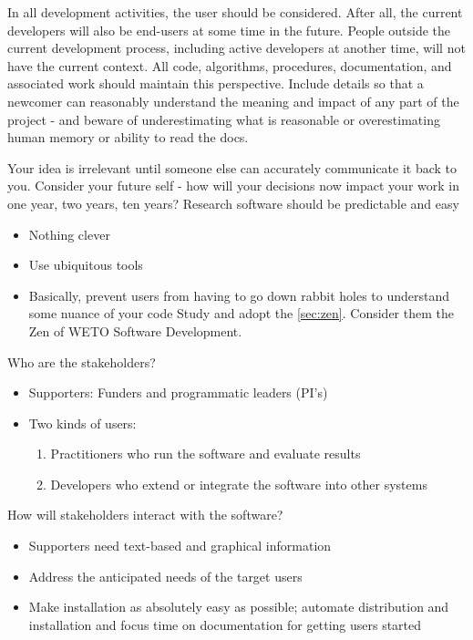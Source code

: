 \documentclass[]{nrel}
\begin{document}
In all development activities, the user should be considered.
After all, the current developers will also be end-users at some time in the future.
People outside the current development process, including active developers at another time,
will not have the current context.
All code, algorithms, procedures, documentation, and associated work should maintain this
perspective.
Include details so that a newcomer can reasonably understand the meaning and impact of any
part of the project - and beware of underestimating what is reasonable or overestimating
human memory or ability to read the docs.


Your idea is irrelevant until someone else can accurately communicate it back to you.
Consider your future self - how will your decisions now impact your work in one year, two years, ten years?
Research software should be predictable and easy
\begin{itemize}
\item Nothing clever

\item Use ubiquitous tools

\item Basically, prevent users from having to go down rabbit holes to understand some nuance of your code
Study and adopt the \ref{sec:zen}. Consider them the Zen of WETO Software Development.

\end{itemize}

Who are the stakeholders?
\begin{itemize}
\item Supporters: Funders and programmatic leaders (PI’s)

\item Two kinds of users:
\begin{enumerate}
\item Practitioners who run the software and evaluate results

\item Developers who extend or integrate the software into other systems

\end{enumerate}

\end{itemize}

How will stakeholders interact with the software?
\begin{itemize}
\item Supporters need text-based and graphical information

\item Address the anticipated needs of the target users

\item Make installation as absolutely easy as possible; automate distribution and installation and
focus time on documentation for getting users started

\end{itemize}
\end{document}
